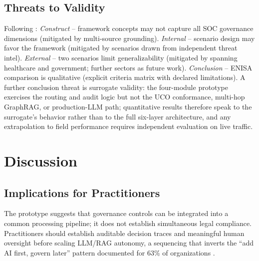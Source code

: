 \documentclass[journal]{IEEEtran}
\begin{document}
\subsection{Threats to Validity}
Following \cite{wohlin2012experimentation}: \emph{Construct} -- framework concepts may not
capture all SOC governance dimensions (mitigated by multi-source grounding). \emph{Internal}
-- scenario design may favor the framework (mitigated by scenarios drawn from independent
threat intel). \emph{External} -- two scenarios limit generalizability (mitigated by spanning
healthcare and government; further sectors as future work). \emph{Conclusion} -- ENISA
comparison is qualitative (explicit criteria matrix with declared limitations).
A further conclusion threat is surrogate validity: the four-module prototype exercises
the routing and audit logic but not the UCO conformance, multi-hop GraphRAG, or
production-LLM path; quantitative results therefore speak to the surrogate's behavior
rather than to the full six-layer architecture, and any extrapolation to field performance
requires independent evaluation on live traffic.

\section{Discussion}
\label{sec:discussion}

\subsection{Implications for Practitioners}
The prototype suggests that governance controls can be integrated into a common processing
pipeline; it does not establish simultaneous legal compliance. Practitioners should establish
auditable decision traces and meaningful human oversight before scaling LLM/RAG autonomy,
a sequencing that inverts the ``add AI first, govern later''
pattern documented for 63\% of organizations \cite{ibm2025costbreach}.
\end{document}
